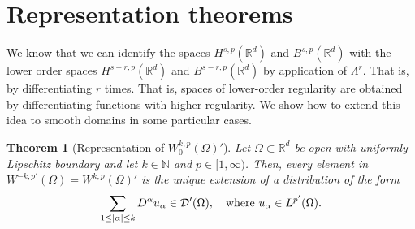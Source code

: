 \documentclass[
    a4paper,
    DIV=14,
    abstract=true,
    numbers=noenddot
]
{scrartcl}
\newtheorem{theorem}{Theorem}[section]
\theoremstyle{definition}
\newcommand{\N}{\mathbb{N}}
\newcommand{\R}{\mathbb{R}}
\newcommand{\Dd}{\mathcal{D}}
\begin{document}
\section{Representation theorems}
We know that we can identify the spaces $H^{s,p}(\R^d )$ and $B^{s,p}(\R^d )$ with the lower order spaces $H^{s-r,p}(\R^d )$ and $B^{s-r,p}(\R^d )$ by application of $\Lambda ^r$. That is, by differentiating $r$ times. That is, spaces of lower-order regularity are obtained by differentiating functions with higher regularity. We show how to extend this idea to smooth domains in some particular cases.

\begin{theorem}[Representation of $W_0^{k,p}(\Omega )'$]\label{riesz representation}
    Let $\Omega \subset \R^d$ be open with uniformly Lipschitz boundary and let  $k \in \N$ and $p \in [1,\infty)$. Then, every element in $W^{-k,p'}(\Omega )=W^{k,p}(\Omega )'$ is the unique extension of a distribution  of the form
    \begin{align*}
        \sum_{1\leq\abs{\alpha}\leq k} D^\alpha u_\alpha\in \Dd'(\Omega ),\quad \text{where }    u_\alpha \in L^{p'}(\Omega ).
    \end{align*}

\end{theorem}
\end{document}
